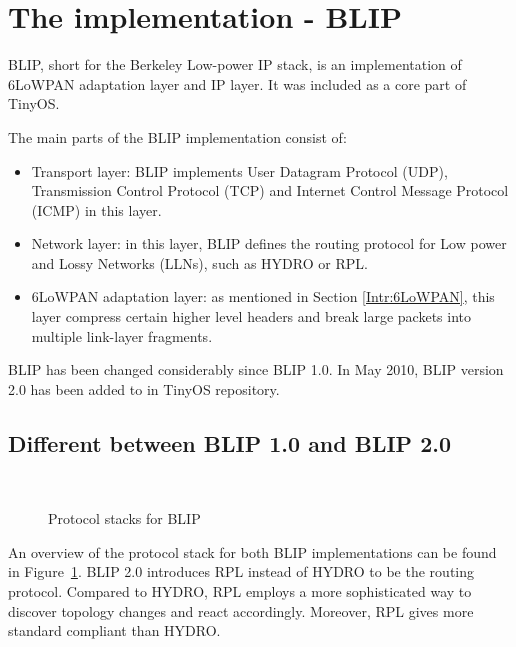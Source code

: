 \section{The implementation - BLIP}
\label{Blip}
BLIP, short for the Berkeley Low-power IP stack, is an implementation of 6LoWPAN adaptation layer and IP layer. It was included as a core part of TinyOS. 

The main parts of the BLIP implementation consist of:
\begin{itemize}
\item Transport layer: BLIP implements User Datagram Protocol (UDP), Transmission Control Protocol (TCP) and Internet Control Message Protocol (ICMP) in this layer.
\newline

\item Network layer: in this layer, BLIP defines the routing protocol for Low power and Lossy Networks (LLNs), such as HYDRO or RPL.
\newline
 
\item 6LoWPAN adaptation layer: as mentioned in Section \ref{Intr:6LoWPAN}, this layer compress certain higher level headers and break large packets into multiple link-layer fragments.
\end{itemize}
\newline

BLIP has been changed considerably since BLIP 1.0. In May 2010, BLIP version 2.0 has been added to in TinyOS repository. 
\subsection{Different between BLIP 1.0 and BLIP 2.0}
\label{Blip:1.0-2.0}

\begin{figure}[htbp]
  \begin{center}
    \leavevmode
    \\
    \caption{Protocol stacks for BLIP}
    \label{fig:blip}
  \end{center}
\end{figure}

An overview of the protocol stack for both BLIP implementations can be found in Figure~\ref{fig:blip}. BLIP 2.0 introduces RPL instead of HYDRO to be the routing protocol. Compared to HYDRO, RPL employs a more sophisticated way to discover topology changes and react accordingly. Moreover, RPL gives more standard compliant than HYDRO.
\newline

